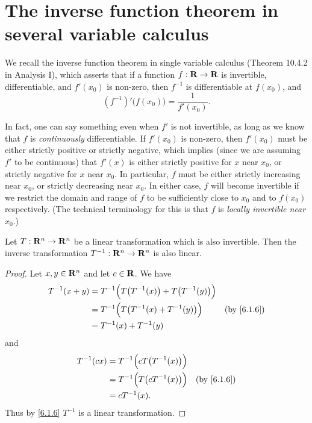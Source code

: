 \section{The inverse function theorem in several variable calculus}\label{sec 6.7}

\begin{note}
  We recall the inverse function theorem in single variable calculus (Theorem 10.4.2 in Analysis I), which asserts that if a function \(f : \mathbf{R} \to \mathbf{R}\) is invertible, differentiable, and \(f'(x_0)\) is non-zero, then \(f^{-1}\) is differentiable at \(f(x_0)\), and
  \[
    (f^{-1})'\big(f(x_0)\big) = \frac{1}{f'(x_0)}.
  \]

  In fact, one can say something even when \(f'\) is not invertible, as long as we know that \(f\) is \emph{continuously} differentiable.
  If \(f'(x_0)\) is non-zero, then \(f'(x_0)\) must be either strictly positive or strictly negative, which implies (since we are assuming \(f'\) to be continuous) that \(f'(x)\) is either strictly positive for \(x\) near \(x_0\), or strictly negative for \(x\) near \(x_0\).
  In particular, \(f\) must be either strictly increasing near \(x_0\), or strictly decreasing near \(x_0\).
  In either case, \(f\) will become invertible if we restrict the domain and range of \(f\) to be sufficiently close to \(x_0\) and to \(f(x_0)\) respectively.
  (The technical terminology for this is that \(f\) is \emph{locally invertible near \(x_0\)}.)
\end{note}

\begin{lemma}\label{6.7.1}
  Let \(T : \mathbf{R}^n \to \mathbf{R}^n\) be a linear transformation which is also invertible.
  Then the inverse transformation \(T^{-1} : \mathbf{R}^n \to \mathbf{R}^n\) is also linear.
\end{lemma}

\begin{proof}
  Let \(x, y \in \mathbf{R}^n\) and let \(c \in \mathbf{R}\).
  We have
  \begin{align*}
    T^{-1}(x + y) & = T^{-1}\Big(T\big(T^{-1}(x)\big) + T\big(T^{-1}(y)\big)\Big)                            \\
                  & = T^{-1}\Big(T\big(T^{-1}(x) + T^{-1}(y)\big)\Big)            & \text{(by \cref{6.1.6})} \\
                  & = T^{-1}(x) + T^{-1}(y)
  \end{align*}
  and
  \begin{align*}
    T^{-1}(cx) & = T^{-1}\Big(c T\big(T^{-1}(x)\big)\Big)                            \\
               & = T^{-1}\Big(T\big(c T^{-1}(x)\big)\Big) & \text{(by \cref{6.1.6})} \\
               & = c T^{-1}(x).
  \end{align*}
  Thus by \cref{6.1.6} \(T^{-1}\) is a linear transformation.
\end{proof}

